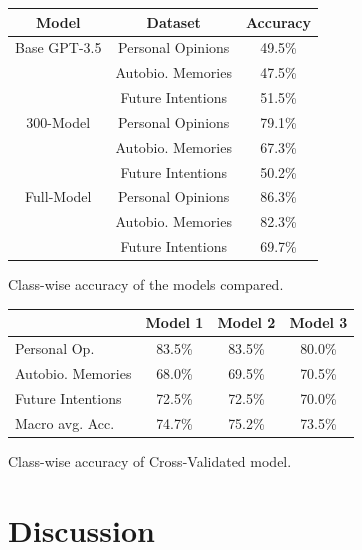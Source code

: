 \documentclass[10pt,twocolumn,letterpaper]{article}
\begin{document}
\begin{center}

    \begin{tabular}{ccc}
        \toprule
        Model & Dataset & Accuracy \\
        \midrule
        Base GPT-3.5 & Personal Opinions & 49.5\% \\
                        & Autobio. Memories & 47.5\% \\
                        & Future Intentions & 51.5\% \\
        \midrule
        300-Model & Personal Opinions & 79.1\% \\
                    & Autobio. Memories & 67.3\% \\
                    & Future Intentions & 50.2\% \\
        \midrule
        Full-Model & Personal Opinions & 86.3\% \\
                    & Autobio. Memories & 82.3\% \\
                    & Future Intentions & 69.7\% \\
        \bottomrule
    \end{tabular} 
\end{center}


\begin{center}
    \small {Class-wise accuracy of the models compared.}
\end{center}

\begin{center}
    \begin{tabular}{lccc}
      \toprule
      & Model 1 & Model 2 & Model 3 \\
      \midrule
      Personal Op. & 83.5\% & 83.5\% & 80.0\% \\
      Autobio. Memories & 68.0\% & 69.5\% & 70.5\% \\
      Future Intentions & 72.5\% & 72.5\% & 70.0\% \\
      \midrule
      Macro avg. Acc. & 74.7\% & 75.2\% & 73.5\% \\
      \bottomrule
    \end{tabular}
\end{center}

\begin{center}
    \small {Class-wise accuracy of Cross-Validated model.}
\end{center}

\section{Discussion}
\end{document}
